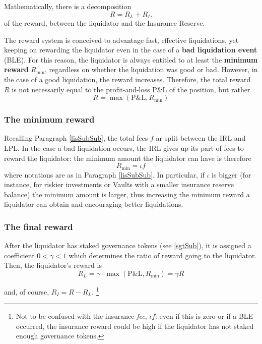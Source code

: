 \documentclass[a4paper,10 pt]{article}
\theoremstyle{definition}
\begin{document}
Mathematically, there is a decomposition $$R = R_L + R_I.$$
of the reward, between the liquidator and the Insurance Reserve.

The reward system is conceived to advantage fast, effective liquidations, yet keeping on rewarding the liquidator even in the case of a {\bf bad liquidation event} (BLE). 
For this reason, the liquidator is always entitled to at least the {\bf minimum reward} $R_{\text{min}}$, regardless on whether the liquidation was good or bad. However, in the case of a good liquidation, the reward increases. Therefore, the total reward $R$ is not necessarily equal to the profit-and-loss P\&L of the position, but rather 
$$R = \max(\text{P\&L}, R_{\text{min}}) $$

\subsubsection{The minimum reward}\label{minrewSubSub}

Recalling Paragraph \ref{lisSubSub}, the total fees $f$ ar split between the IRL and LPL. In the case a bad liquidation occurs, the IRL gives up its part of fees to reward the liquidator: the minimum amount the liquidator can have is therefore 
\begin{equation}\label{minreward}
R_{\text{min}} = \iota f
\end{equation}
where notations are as in Paragraph \ref{lisSubSub}. In particular, if $\iota$ is bigger (for instance, for riskier investments or Vaults with a smaller insurance reserve balance) the minimum amount is larger, thus increasing the minimum reward a liquidator can obtain and encouraging better liquidations.

\subsubsection{The final reward}\label{finrewSubSub}

After the liquidator has staked governance tokens (see \ref{sgtSub}), it is assigned a coefficient $0 < \gamma < 1$ which determines the ratio of reward going to the liquidator. Then, the liquidator's reward is 
\begin{equation}\label{liquidatorreward}
R_L = \gamma\cdot \max(\text{P\&L},R_{\text{min}}) = \gamma  R
\end{equation}

and, of course, $R_I = R - R_L$. \footnote{Not to be confused with the insurance {\it fee}, $\iota f$: even if this is zero or if a BLE occurred, the insurance reward could be high if the liquidator has not staked enough governance tokens.}
\end{document}
